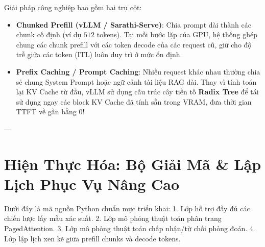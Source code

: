 Giải pháp công nghiệp bao gồm hai trụ cột:
\begin{itemize}
  \item \textbf{Chunked Prefill (vLLM / Sarathi-Serve)}: Chia prompt dài thành các chunk cố định (ví dụ $512$ tokens). Tại mỗi bước lặp của GPU, hệ thống ghép chung các chunk prefill với các token decode của các request cũ, giữ cho độ trễ giữa các token (ITL) luôn duy trì ở mức ổn định.
  \item \textbf{Prefix Caching / Prompt Caching}: Nhiều request khác nhau thường chia sẻ chung System Prompt hoặc ngữ cảnh tài liệu RAG dài. Thay vì tính toán lại KV Cache từ đầu, vLLM sử dụng cấu trúc cây tiền tố \textbf{Radix Tree} để tái sử dụng ngay các block KV Cache đã tính sẵn trong VRAM, đưa thời gian TTFT về gần bằng 0!
\end{itemize}

---

\section{Hiện Thực Hóa: Bộ Giải Mã \& Lập Lịch Phục Vụ Nâng Cao}
\label{sec:ch07-implementation}

Dưới đây là mã nguồn Python chuẩn mực triển khai:
1. Lớp  hỗ trợ đầy đủ các chiến lược lấy mẫu xác suất.
2. Lớp  mô phỏng thuật toán phân trang PagedAttention.
3. Lớp  mô phỏng thuật toán chấp nhận/từ chối phỏng đoán.
4. Lớp  lập lịch xen kẽ giữa prefill chunks và decode tokens.

